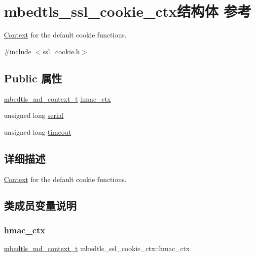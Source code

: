\hypertarget{structmbedtls__ssl__cookie__ctx}{}\section{mbedtls\+\_\+ssl\+\_\+cookie\+\_\+ctx结构体 参考}
\label{structmbedtls__ssl__cookie__ctx}


\hyperlink{struct_context}{Context} for the default cookie functions.  




{\ttfamily \#include $<$ssl\+\_\+cookie.\+h$>$}

\subsection*{Public 属性}
\begin{DoxyCompactItemize}
\item 
\hyperlink{structmbedtls__md__context__t}{mbedtls\+\_\+md\+\_\+context\+\_\+t} \hyperlink{structmbedtls__ssl__cookie__ctx_a3142057d5ce904db6ee134ff6d5f3b7c}{hmac\+\_\+ctx}
\item 
unsigned long \hyperlink{structmbedtls__ssl__cookie__ctx_abd16c13055ac6f87e93ffbdfa4a957bf}{serial}
\item 
unsigned long \hyperlink{structmbedtls__ssl__cookie__ctx_adf87598d619f8fcf161965301c423ffb}{timeout}
\end{DoxyCompactItemize}


\subsection{详细描述}
\hyperlink{struct_context}{Context} for the default cookie functions. 

\subsection{类成员变量说明}
\mbox{\label{structmbedtls__ssl__cookie__ctx_a3142057d5ce904db6ee134ff6d5f3b7c}} 
\subsubsection{\texorpdfstring{hmac\+\_\+ctx}{hmac\_ctx}}
{\footnotesize\ttfamily \hyperlink{structmbedtls__md__context__t}{mbedtls\+\_\+md\+\_\+context\+\_\+t} mbedtls\+\_\+ssl\+\_\+cookie\+\_\+ctx\+::hmac\+\_\+ctx}


